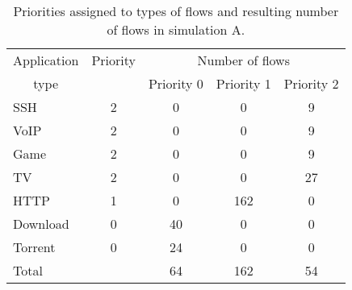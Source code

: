\begin{table}
	\caption{Priorities assigned to types of flows and resulting number of flows in simulation A.}
	\label{tab:flows_count_A}
	\centering
	
	\begin{tabular}{@{}l|cccc@{}}
		\toprule
		\multicolumn{1}{c|}{Application} & Priority & \multicolumn{3}{c}{Number of flows}  \\
		\multicolumn{1}{c|}{type}        &          & Priority 0 & Priority 1 & Priority 2 \\ \midrule
		SSH                              &    2     &     0      &     0      &     9      \\
		VoIP                             &    2     &     0      &     0      &     9      \\
		Game                             &    2     &     0      &     0      &     9      \\
		TV                               &    2     &     0      &     0      &     27     \\
		HTTP                             &    1     &     0      &    162     &     0      \\
		Download                         &    0     &     40     &     0      &     0      \\
		Torrent                          &    0     &     24     &     0      &     0      \\ \midrule
		Total                            &          &     64     &    162     &     54     \\ \bottomrule
	\end{tabular}
\end{table}
